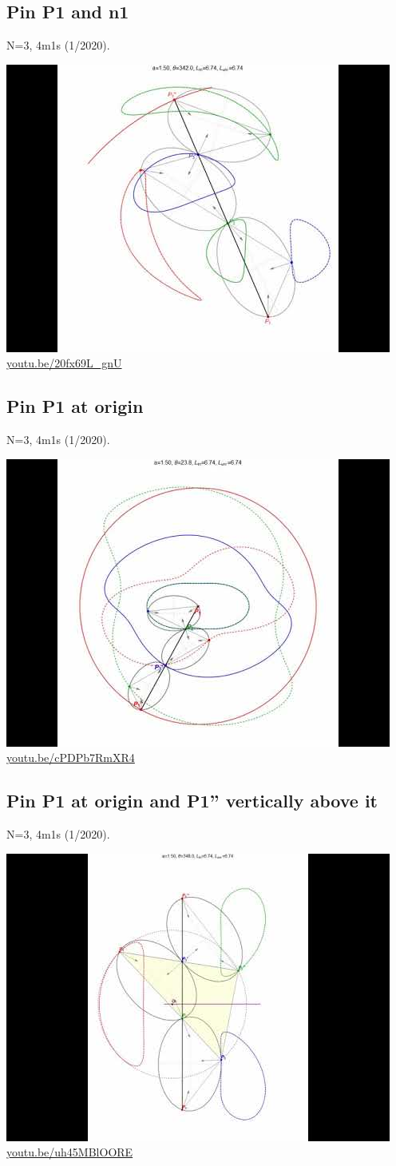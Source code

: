 \documentclass[12pt]{amsart}
\begin{document}
\subsection{Pin P1 and n1}
\label{vid:20fx69L_gnU}
\noindent N=3, 4m1s (1/2020). 
\begin{center}\includegraphics[width=.5\textwidth]{pics/20fx69L_gnU.jpg} \\ 
\href{https://youtu.be/20fx69L_gnU}{\url{youtu.be/20fx69L\_gnU}}\end{center}
% 
\subsection{Pin P1 at origin}
\label{vid:cPDPb7RmXR4}
\noindent N=3, 4m1s (1/2020). 
\begin{center}\includegraphics[width=.5\textwidth]{pics/cPDPb7RmXR4.jpg} \\ 
\href{https://youtu.be/cPDPb7RmXR4}{\url{youtu.be/cPDPb7RmXR4}}\end{center}
% 
\subsection{Pin P1 at origin and P1'' vertically above it}
\label{vid:uh45MBlOORE}
\noindent N=3, 4m1s (1/2020). 
\begin{center}\includegraphics[width=.5\textwidth]{pics/uh45MBlOORE.jpg} \\ 
\href{https://youtu.be/uh45MBlOORE}{\url{youtu.be/uh45MBlOORE}}\end{center}
% 




\end{document}
